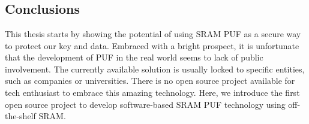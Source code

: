 \chapter{\chapterSix}
\label{chp:6}

\section{Conclusions}
This thesis starts by showing the potential of using SRAM PUF as a secure way to protect our key and data. Embraced with a bright prospect, it is unfortunate that the development of PUF in the real world seems to lack of public involvement. The currently available solution is usually locked to specific entities, such as companies or universities. There is no open source project available for tech enthusiast to embrace this amazing technology. Here, we introduce the first open source project to develop software-based SRAM PUF technology using off-the-shelf SRAM.

